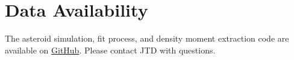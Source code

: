 \documentclass[fleqn,usenatbib]{mnras}
\begin{document}
\section*{Data Availability}

The asteroid simulation, fit process, and density moment extraction code are available on \href{https://github.com/jack-dinsmore/asteroid-tidal-torque}{GitHub}. Please contact JTD with questions.










\bsp
\label{lastpage}
\end{document}
